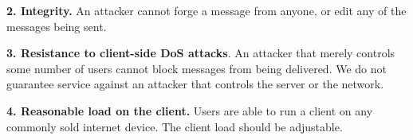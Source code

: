 \textbf{2. Integrity.} An attacker cannot forge a message from anyone, or edit any of the messages being sent.

\textbf{3. Resistance to client-side DoS attacks}. An attacker that merely controls some number of users cannot block messages from being delivered. We do not guarantee service against an attacker that controls the server or the network.

\textbf{4. Reasonable load on the client.} Users are able to run a client on any commonly sold internet device. The client load should be adjustable.

